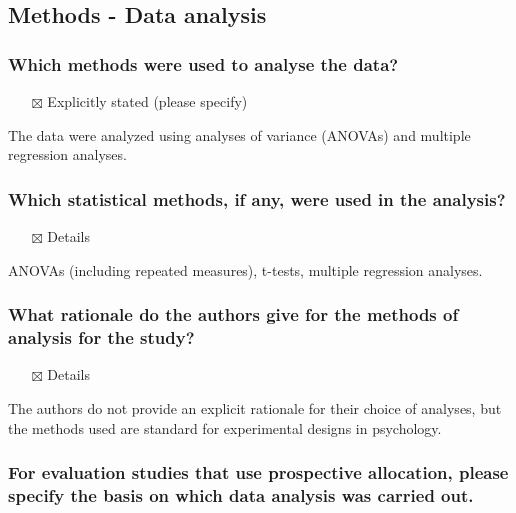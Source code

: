 \documentclass[
  doc, a4paper]{apa7}
\providecommand{\tightlist}{%
  \setlength{\itemsep}{0pt}\setlength{\parskip}{0pt}}
\begin{document}
\subsection{Methods - Data analysis}\label{methods---data-analysis}

\subsubsection{Which methods were used to analyse the data?}\label{which-methods-were-used-to-analyse-the-data}

\begin{itemize}
\tightlist
\item[$\boxtimes$]
  Explicitly stated (please specify)
\end{itemize}

The data were analyzed using analyses of variance (ANOVAs) and multiple regression analyses.

\subsubsection{Which statistical methods, if any, were used in the analysis?}\label{which-statistical-methods-if-any-were-used-in-the-analysis}

\begin{itemize}
\tightlist
\item[$\boxtimes$]
  Details
\end{itemize}

ANOVAs (including repeated measures), t-tests, multiple regression analyses.

\subsubsection{What rationale do the authors give for the methods of analysis for the study?}\label{what-rationale-do-the-authors-give-for-the-methods-of-analysis-for-the-study}

\begin{itemize}
\tightlist
\item[$\boxtimes$]
  Details
\end{itemize}

The authors do not provide an explicit rationale for their choice of analyses, but the methods used are standard for experimental designs in psychology.

\subsubsection{For evaluation studies that use prospective allocation, please specify the basis on which data analysis was carried out.}\label{for-evaluation-studies-that-use-prospective-allocation-please-specify-the-basis-on-which-data-analysis-was-carried-out.}
\end{document}
